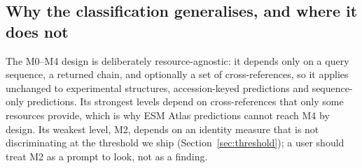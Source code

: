 \subsection{Why the classification generalises, and where it does not}

The M0--M4 design is deliberately resource-agnostic: it depends only on a query
sequence, a returned chain, and optionally a set of cross-references, so it applies
unchanged to experimental structures, accession-keyed predictions and
sequence-only predictions. Its strongest levels depend on cross-references that
only some resources provide, which is why ESM Atlas predictions cannot reach M4 by
design. Its weakest level, M2, depends on an identity measure that is not
discriminating at the threshold we ship (Section~\ref{sec:threshold}); a user
should treat M2 as a prompt to look, not as a finding.
